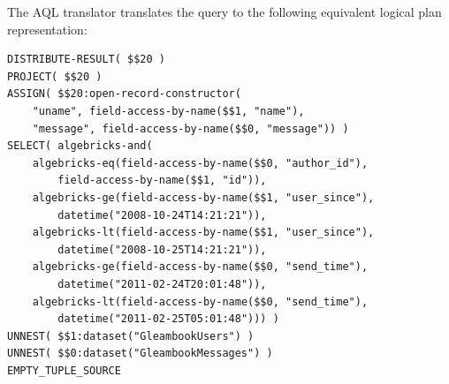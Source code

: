 
The AQL translator translates
the query to the following equivalent logical plan representation:

\lstset{numbers=left, numberstyle=\tiny, stepnumber=1, numbersep=5pt}
\begin{center}
\scriptsize
\begin{lstlisting}
DISTRIBUTE-RESULT( $$20 )
PROJECT( $$20 )
ASSIGN( $$20:open-record-constructor(
    "uname", field-access-by-name($$1, "name"),
    "message", field-access-by-name($$0, "message")) )
SELECT( algebricks-and(
    algebricks-eq(field-access-by-name($$0, "author_id"), 
        field-access-by-name($$1, "id")), 
    algebricks-ge(field-access-by-name($$1, "user_since"), 
        datetime("2008-10-24T14:21:21")), 
    algebricks-lt(field-access-by-name($$1, "user_since"), 
        datetime("2008-10-25T14:21:21")), 
    algebricks-ge(field-access-by-name($$0, "send_time"), 
        datetime("2011-02-24T20:01:48")), 
    algebricks-lt(field-access-by-name($$0, "send_time"), 
        datetime("2011-02-25T05:01:48"))) )
UNNEST( $$1:dataset("GleambookUsers") )
UNNEST( $$0:dataset("GleambookMessages") ) 
EMPTY_TUPLE_SOURCE
\end{lstlisting}
\end{center}

